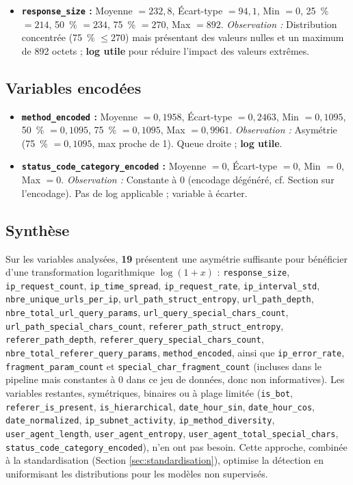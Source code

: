 \documentclass[a4paper,12pt]{article}
\begin{document}
\begin{itemize}
  \item \textbf{\texttt{response\_size} :} Moyenne $= 232{,}8$, Écart-type $= 94{,}1$, Min $= 0$, 25~\% $= 214$, 50~\% $= 234$, 75~\% $= 270$, Max $= 892$. \emph{Observation :} Distribution concentrée (75~\% $\leq 270$) mais présentant des valeurs nulles et un maximum de 892 octets ; \textbf{log utile} pour réduire l'impact des valeurs extrêmes.
\end{itemize}

\subsection{Variables encodées}

\begin{itemize}
  \item \textbf{\texttt{method\_encoded} :} Moyenne $= 0{,}1958$, Écart-type $= 0{,}2463$, Min $= 0{,}1095$, 50~\% $= 0{,}1095$, 75~\% $= 0{,}1095$, Max $= 0{,}9961$. \emph{Observation :} Asymétrie (75~\% $= 0{,}1095$, max proche de 1). Queue droite ; \textbf{log utile}.
  \item \textbf{\texttt{status\_code\_category\_encoded} :} Moyenne $= 0$, Écart-type $= 0$, Min $= 0$, Max $= 0$. \emph{Observation :} Constante à 0 (encodage dégénéré, cf. Section sur l'encodage). Pas de log applicable ; variable à écarter.
\end{itemize}

\subsection{Synthèse}

Sur les variables analysées, \textbf{19} présentent une asymétrie suffisante pour bénéficier d'une transformation logarithmique $\log(1 + x)$ : \texttt{response\_size}, \texttt{ip\_request\_count}, \texttt{ip\_time\_spread}, \texttt{ip\_request\_rate}, \texttt{ip\_interval\_std}, \texttt{nbre\_unique\_urls\_per\_ip}, \texttt{url\_path\_struct\_entropy}, \texttt{url\_path\_depth}, \texttt{nbre\_total\_url\_query\_params}, \texttt{url\_query\_special\_chars\_count}, \texttt{url\_path\_special\_chars\_count}, \texttt{referer\_path\_struct\_entropy}, \texttt{referer\_path\_depth}, \texttt{referer\_query\_special\_chars\_count}, \texttt{nbre\_total\_referer\_query\_params}, \texttt{method\_encoded}, ainsi que \texttt{ip\_error\_rate}, \texttt{fragment\_param\_count} et \texttt{special\_char\_fragment\_count} (incluses dans le pipeline mais constantes à 0 dans ce jeu de données, donc non informatives). Les variables restantes, symétriques, binaires ou à plage limitée (\texttt{is\_bot}, \texttt{referer\_is\_present}, \texttt{is\_hierarchical}, \texttt{date\_hour\_sin}, \texttt{date\_hour\_cos}, \texttt{date\_normalized}, \texttt{ip\_subnet\_activity}, \texttt{ip\_method\_diversity}, \texttt{user\_agent\_length}, \texttt{user\_agent\_entropy}, \texttt{user\_agent\_total\_special\_chars}, \texttt{status\_code\_category\_encoded}), n'en ont pas besoin. Cette approche, combinée à la standardisation (Section \ref{sec:standardisation}), optimise la détection en uniformisant les distributions pour les modèles non supervisés.
\end{document}

